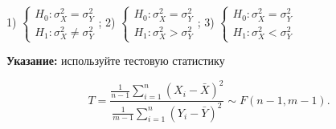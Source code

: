 1) $\left\{\begin{array}{l} {H_{0} :\sigma _{X}^{2} =\sigma _{Y}^{2} } \\ {H_{1} :\sigma _{X}^{2} \ne \sigma _{Y}^{2} } \end{array}\right. $;             2) $\left\{\begin{array}{l} {H_{0} :\sigma _{X}^{2} =\sigma _{Y}^{2} } \\ {H_{1} :\sigma _{X}^{2} >\sigma _{Y}^{2} } \end{array}\right. $;             3) $\left\{\begin{array}{l} {H_{0} :\sigma _{X}^{2} =\sigma _{Y}^{2} } \\ {H_{1} :\sigma _{X}^{2} <\sigma _{Y}^{2} } \end{array}\right. $

\textbf{Указание:} используйте тестовую статистику

\[T=\frac{{\tfrac{1}{n-1}} \sum _{i=1}^{n}(X_{i} -\bar{X})^{2}  }{{\tfrac{1}{m-1}} \sum _{i=1}^{n}(Y_{i} -\bar{Y})^{2}  } \sim F(n-1,m-1).\] 





